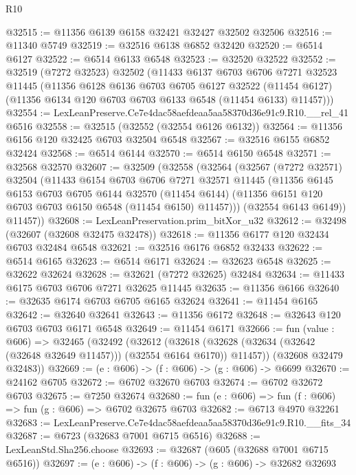 \begin{lexlean}{R10}
\begin{coremodule}
@32515 := @11356 @6139 @6158 @32421 @32427 @32502 @32506
@32516 := @11340 @5749
@32519 := @32516 @6138 @6852 @32420
@32520 := @6514 @6127
@32522 := @6514 @6133 @6548
@32523 := @32520 @32522
@32552 := @32519
    (@7272 @32523)
    @32502
    (@11433
      @6137
      @6703
      @6706
      @7271
      @32523
      @11445
      (@11356
        @6128
        @6136
        @6703
        @6705
        @6127
        @32522
        (@11454 @6127)
        (@11356 @6134 @120 @6703 @6703 @6133 @6548 (@11454 @6133) @11457)))
@32554 := LexLeanPreserve.Ce7e4dac58aefdeaa5aa58370d36e91c9.R10.__rel_41 @6516
@32558 := @32515 (@32552 (@32554 @6126 @6132))
@32564 := @11356 @6156 @120 @32425 @6703 @32504 @6548
@32567 := @32516 @6155 @6852 @32424
@32568 := @6514 @6144
@32570 := @6514 @6150 @6548
@32571 := @32568 @32570
@32607 := @32509
    (@32558
      (@32564
        (@32567
          (@7272 @32571)
          @32504
          (@11433
            @6154
            @6703
            @6706
            @7271
            @32571
            @11445
            (@11356
              @6145
              @6153
              @6703
              @6705
              @6144
              @32570
              (@11454 @6144)
              (@11356 @6151 @120 @6703 @6703 @6150 @6548 (@11454 @6150) @11457)))
          (@32554 @6143 @6149))
        @11457))
@32608 := LexLeanPreservation.prim_bitXor_u32
@32612 := @32498 (@32607 (@32608 @32475 @32478))
@32618 := @11356 @6177 @120 @32434 @6703 @32484 @6548
@32621 := @32516 @6176 @6852 @32433
@32622 := @6514 @6165
@32623 := @6514 @6171
@32624 := @32623 @6548
@32625 := @32622 @32624
@32628 := @32621 (@7272 @32625) @32484
@32634 := @11433 @6175 @6703 @6706 @7271 @32625 @11445
@32635 := @11356 @6166
@32640 := @32635 @6174 @6703 @6705 @6165 @32624
@32641 := @11454 @6165
@32642 := @32640 @32641
@32643 := @11356 @6172
@32648 := @32643 @120 @6703 @6703 @6171 @6548
@32649 := @11454 @6171
@32666 := fun (value : @606) =>
  @32465
    (@32492
      (@32612
        (@32618 (@32628 (@32634 (@32642 (@32648 @32649 @11457))) (@32554 @6164 @6170)) @11457))
      (@32608 @32479 @32483))
@32669 := (e : @606) -> (f : @606) -> (g : @606) -> @6699
@32670 := @24162 @6705
@32672 := @6702 @32670 @6703
@32674 := @6702 @32672 @6703
@32675 := @7250 @32674
@32680 := fun (e : @606) => fun (f : @606) => fun (g : @606) => @6702 @32675 @6703
@32682 := @6713 @4970 @32261
@32683 := LexLeanPreserve.Ce7e4dac58aefdeaa5aa58370d36e91c9.R10.__fits_34
@32687 := @6723 (@32683 @7001 @6715 @6516)
@32688 := LexLeanStd.Sha256.choose
@32693 := @32687 (@605 (@32688 @7001 @6715 @6516))
@32697 := (e : @606) -> (f : @606) -> (g : @606) -> @32682 @32693

\end{coremodule}
\end{lexlean}
